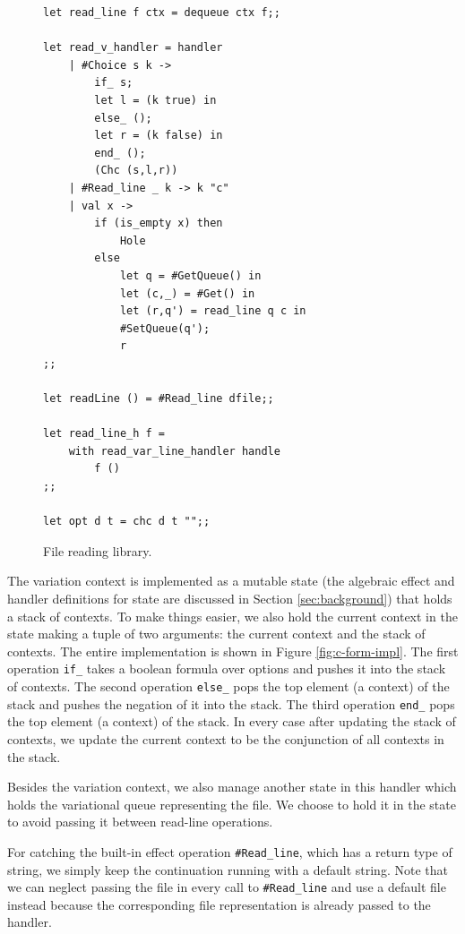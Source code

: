 \begin{figure}[!h]
 \begin{lstlisting}[]
let read_line f ctx = dequeue ctx f;;

let read_v_handler = handler
    | #Choice s k ->
        if_ s;
        let l = (k true) in
        else_ ();
        let r = (k false) in
        end_ ();
        (Chc (s,l,r))
    | #Read_line _ k -> k "c"
    | val x -> 
        if (is_empty x) then 
            Hole
        else 
            let q = #GetQueue() in
            let (c,_) = #Get() in
            let (r,q') = read_line q c in
            #SetQueue(q');  
            r
;;

let readLine () = #Read_line dfile;;

let read_line_h f = 
    with read_var_line_handler handle
        f ()
;;

let opt d t = chc d t "";;
\end{lstlisting}
\caption{File reading library.}
\label{fig:read-lib}
\end{figure}

The variation context is implemented as a mutable state (the algebraic effect and handler definitions for state are discussed in Section \ref{sec:background}) that holds a stack of contexts. To make things easier, we also hold the current context in the state making a tuple of two arguments: the current context and the stack of contexts. The entire implementation is shown in Figure \ref{fig:c-form-impl}. The first operation \texttt{if\_} takes a boolean formula over options and pushes it into the stack of contexts. The second operation \texttt{else\_} pops the top element (a context) of the stack and pushes the negation of it into the stack. The third operation \texttt{end\_} pops the top element (a context) of the stack. In every case after updating the stack of contexts, we update the current context to be the conjunction of all contexts in the stack.

Besides the variation context, we also manage another state in this handler which holds the variational queue representing the file. We choose to hold it in the state to avoid passing it between read-line operations. 

For catching the built-in effect operation \texttt{\#Read\_line}, which has a return type of string, we simply keep the continuation running with a default string. Note that we can neglect passing the file in every call to \texttt{\#Read\_line} and use a default file instead because the corresponding file representation is already passed to the handler. 

